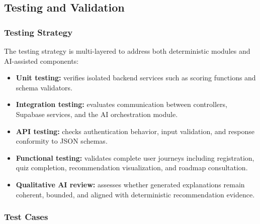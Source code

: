 \documentclass[12pt,a4paper]{article}
\begin{document}
\subsection{Testing and Validation}

\subsubsection{Testing Strategy}

The testing strategy is multi-layered to address both deterministic modules and AI-assisted components:
\begin{itemize}
  \item \textbf{Unit testing:} verifies isolated backend services such as scoring functions and schema validators.
  \item \textbf{Integration testing:} evaluates communication between controllers, Supabase services, and the AI orchestration module.
  \item \textbf{API testing:} checks authentication behavior, input validation, and response conformity to JSON schemas.
  \item \textbf{Functional testing:} validates complete user journeys including registration, quiz completion, recommendation visualization, and roadmap consultation.
  \item \textbf{Qualitative AI review:} assesses whether generated explanations remain coherent, bounded, and aligned with deterministic recommendation evidence.
\end{itemize}

\subsubsection{Test Cases}
\end{document}
